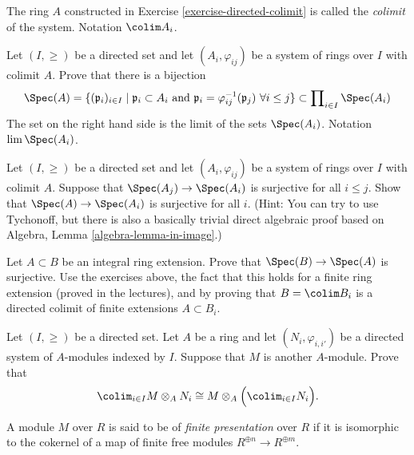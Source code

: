 \begin{definition}
\label{definition-colimit}
The ring $A$ constructed in Exercise \ref{exercise-directed-colimit}
is called the {\it colimit} of the system. Notation $\colim A_i$.
\end{definition}

\begin{exercise}
\label{exercise-prime-in-colimit}
Let $(I, \geq)$ be a directed set and let
$(A_i, \varphi_{ij})$ be a system of rings over $I$ with colimit
$A$. Prove that there is a bijection
$$
\Spec(A) = \{(\mathfrak p_i)_{i \in I} \mid
\mathfrak p_i \subset A_i \text{ and }
\mathfrak p_i = \varphi_{ij}^{-1}(\mathfrak p_j)\ \forall i \leq j\}
\subset \prod\nolimits_{i \in I} \Spec(A_i)
$$
The set on the right hand side is the limit of the sets
$\Spec(A_i)$. Notation $\lim \Spec(A_i)$.
\end{exercise}

\begin{exercise}
\label{exercise-colimit-surjective}
Let $(I, \geq)$ be a directed set and let
$(A_i, \varphi_{ij})$ be a system of rings over $I$ with colimit
$A$. Suppose that $\Spec(A_j) \to \Spec(A_i)$ is
surjective for all $i \leq j$. Show that
$\Spec(A) \to \Spec(A_i)$ is surjective for all $i$.
(Hint: You can try to use Tychonoff, but there is also a basically trivial
direct algebraic proof based on
Algebra, Lemma \ref{algebra-lemma-in-image}.)
\end{exercise}

\begin{exercise}
\label{exercise-integral-colimit-finite}
Let $A \subset B$ be an integral ring extension. Prove that
$\Spec(B) \to \Spec(A)$ is surjective.
Use the exercises above, the fact that this holds for a finite ring
extension (proved in the lectures), and by proving that
$B = \colim B_i$ is a directed colimit of finite extensions $A \subset B_i$.
\end{exercise}

\begin{exercise}
\label{exercise-colimit-tensor}
Let $(I, \geq)$ be a directed set.
Let $A$ be a ring and let $(N_i, \varphi_{i, i'})$ be a directed system of
$A$-modules indexed by $I$. Suppose that $M$ is another $A$-module. Prove
that
$$
\colim_{i\in I} M \otimes_A N_i\cong
M \otimes_A \Big( \colim_{i\in I} N_i\Big).
$$
\end{exercise}

\begin{definition}
\label{definition-finite-presentation}
A module $M$ over $R$ is said to be of {\it finite presentation} over
$R$ if it  is isomorphic to the cokernel of a map of finite free modules
$ R^{\oplus n} \to R^{\oplus m}$.
\end{definition}

